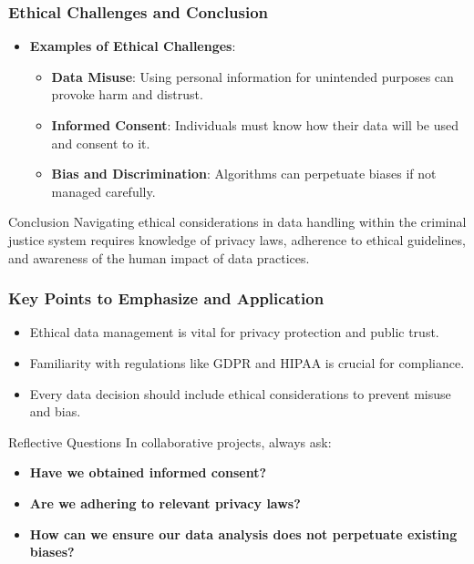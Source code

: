 \documentclass[aspectratio=169]{beamer}
\begin{document}
\begin{frame}[fragile]
    \frametitle{Ethical Challenges and Conclusion}
    \begin{itemize}
        \item \textbf{Examples of Ethical Challenges}:
        \begin{itemize}
            \item \textbf{Data Misuse}: Using personal information for unintended purposes can provoke harm and distrust.
            \item \textbf{Informed Consent}: Individuals must know how their data will be used and consent to it.
            \item \textbf{Bias and Discrimination}: Algorithms can perpetuate biases if not managed carefully.
        \end{itemize}
    \end{itemize}

    \begin{block}{Conclusion}
        Navigating ethical considerations in data handling within the criminal justice system requires knowledge of privacy laws, adherence to ethical guidelines, and awareness of the human impact of data practices.
    \end{block}
\end{frame}

\begin{frame}[fragile]
    \frametitle{Key Points to Emphasize and Application}
    \begin{itemize}
        \item Ethical data management is vital for privacy protection and public trust.
        \item Familiarity with regulations like GDPR and HIPAA is crucial for compliance.
        \item Every data decision should include ethical considerations to prevent misuse and bias.
    \end{itemize}

    \begin{block}{Reflective Questions}
        In collaborative projects, always ask:
        \begin{itemize}
            \item \textbf{Have we obtained informed consent?}
            \item \textbf{Are we adhering to relevant privacy laws?}
            \item \textbf{How can we ensure our data analysis does not perpetuate existing biases?}
        \end{itemize}
    \end{block}
\end{frame}
\end{document}
